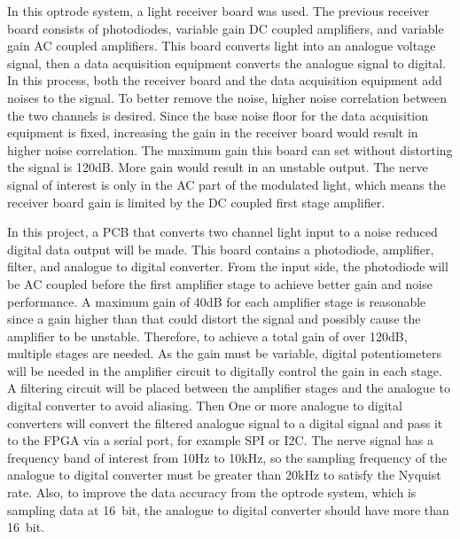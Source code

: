 In this optrode system, a light receiver board was used.  The previous receiver board consists of photodiodes, variable gain DC coupled amplifiers, and variable gain AC coupled amplifiers.  This board converts light into an analogue voltage signal, then a data acquisition equipment converts the analogue signal to digital.  In this process, both the receiver board and the data acquisition equipment add noises to the signal.  To better remove the noise, higher noise correlation between the two channels is desired.  Since the base noise floor for the data acquisition equipment is fixed, increasing the gain in the receiver board would result in higher noise correlation.  The maximum gain this board can set without distorting the signal is 120dB.  More gain would result in an unstable output.  The nerve signal of interest is only in the AC part of the modulated light, which means the receiver board gain is limited by the DC coupled first stage amplifier.  

In this project, a PCB that converts two channel light input to a noise reduced digital data output will be made.  This board contains a photodiode, amplifier, filter, and analogue to digital converter.  From the input side, the photodiode will be AC coupled before the first amplifier stage to achieve better gain and noise performance.  A maximum gain of 40dB for each amplifier stage is reasonable since a gain higher than that could distort the signal and possibly cause the amplifier to be unstable.  Therefore, to achieve a total gain of over 120dB, multiple stages are needed.  As the gain must be variable, digital potentiometers will be needed in the amplifier circuit to digitally control the gain in each stage.  A filtering circuit will be placed between the amplifier stages and the analogue to digital converter to avoid aliasing.  Then One or more analogue to digital converters will convert the filtered analogue signal to a digital signal and pass it to the FPGA via a serial port, for example SPI or I2C.  The nerve signal has a frequency band of interest from 10Hz to 10kHz, so the sampling frequency of the analogue to digital converter must be greater than 20kHz to satisfy the Nyquist rate.  Also, to improve the data accuracy from the optrode system, which is sampling data at \qty{16}{bit}, the analogue to digital converter should have more than \qty{16}{bit}.

